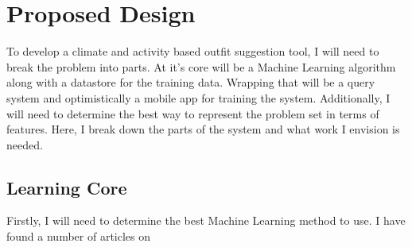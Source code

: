 \section{Proposed Design}
\label{section:propeseddesign}
To develop a climate and activity based outfit suggestion tool, I will need to break the problem into parts.
At it's core will be a Machine Learning algorithm along with a datastore for the training data. Wrapping that will
be a query system and optimistically a mobile app for training the system. Additionally, I will need to determine 
the best way to represent the problem set in terms of features. Here, I break down the parts of the system and what
work I envision is needed.

\subsection{Learning Core}
Firstly, I will need to determine the best Machine Learning method to use. I have found a number of articles on

